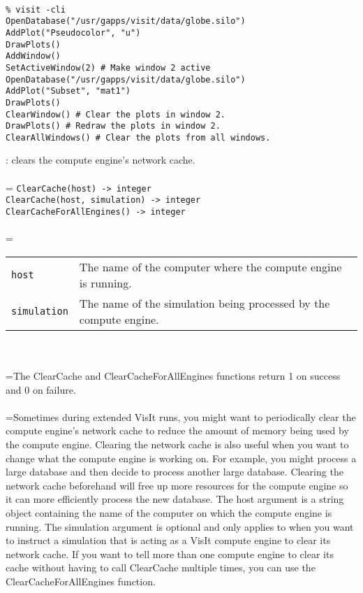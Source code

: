 \documentclass[10pt,a4paper]{report}
\begin{document}
\\[-6mm]
\begin{verbatim}% visit -cli
OpenDatabase("/usr/gapps/visit/data/globe.silo")
AddPlot("Pseudocolor", "u")
DrawPlots()
AddWindow()
SetActiveWindow(2) # Make window 2 active
OpenDatabase("/usr/gapps/visit/data/globe.silo")
AddPlot("Subset", "mat1")
DrawPlots()
ClearWindow() # Clear the plots in window 2.
DrawPlots() # Redraw the plots in window 2.
ClearAllWindows() # Clear the plots from all windows.
\end{verbatim}
\newpage


{}
: clears the compute engine's network cache.\\[-3mm]

 \\ 
\hangindent=\parindent 
\verb!ClearCache(host) -> integer!\\ 
\verb!ClearCache(host, simulation) -> integer!\\ 
\verb!ClearCacheForAllEngines() -> integer!\\ [-3mm]

 \\ 
\hangindent=\parindent 
\begin{tabular}{lp{9cm}}
\verb!host! & The name of the computer where the compute engine is running. \\
\verb!simulation! & The name of the simulation being processed by the compute engine. \\
\end{tabular} \\[-2mm]


 \\ 
\hangindent=\parindent The ClearCache and ClearCacheForAllEngines functions return 1 on success and 0 on failure. \\[-3mm] 

 \\ 
\hangindent=\parindent Sometimes during extended VisIt runs, you might want to periodically clear the compute engine's network cache to reduce the amount of memory being used by the compute engine. Clearing the network cache is also useful when you want to change what the compute engine is working on. For example, you might process a large database and then decide to process another large database. Clearing the network cache beforehand will free up more resources for the compute engine so it can more efficiently process the new database. The host argument is a string object containing the name of the computer on which the compute engine is running. The simulation argument is optional and only applies to when you want to instruct a simulation that is acting as a VisIt compute engine to clear its network cache. If you want to tell more than one compute engine to clear its cache without having to call ClearCache multiple times, you can use the ClearCacheForAllEngines function. \\[-3mm] 
\end{document}
